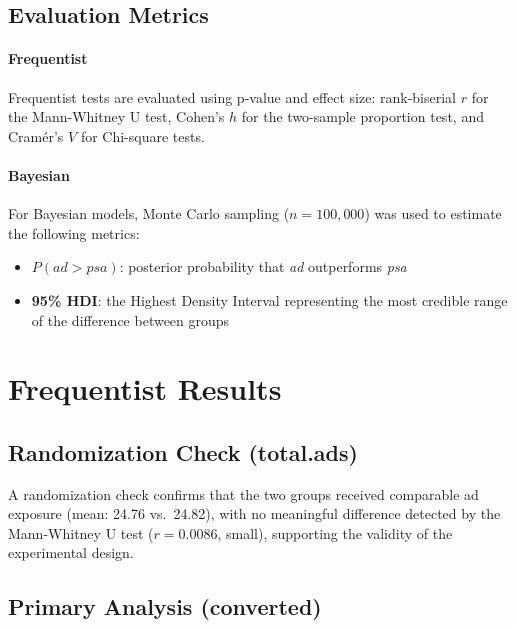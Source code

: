 \documentclass[12pt]{article}
\begin{document}
\subsection{Evaluation Metrics}

\paragraph{Frequentist}
Frequentist tests are evaluated using p-value and effect size: rank-biserial $r$ 
for the Mann-Whitney U test, Cohen's $h$ for the two-sample proportion test, and 
Cramér's $V$ for Chi-square tests.

\paragraph{Bayesian}
For Bayesian models, Monte Carlo sampling ($n = 100{,}000$) was used to estimate 
the following metrics:

\begin{itemize}
    \item $P(\textit{ad} > \textit{psa})$: posterior probability that \textit{ad} 
    outperforms \textit{psa}
    \item \textbf{95\% HDI}: the Highest Density Interval representing the most 
    credible range of the difference between groups
\end{itemize}



\section{Frequentist Results}

\subsection{Randomization Check (total.ads)}

A randomization check confirms that the two groups received comparable ad exposure 
(mean: 24.76 vs.\ 24.82), with no meaningful difference detected by the Mann-Whitney 
U test ($r = 0.0086$, small), supporting the validity of the experimental design.

\subsection{Primary Analysis (converted)}
\end{document}
